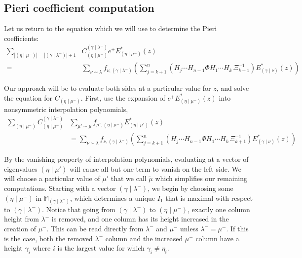 \documentclass[11pt]{article}
\theoremstyle{definition}
\numberwithin{equation}{section}
\newcommand{\ep}{e^+}
\newcommand{\Estar}[1]{E^*_{#1}}
\newcommand{\MM}{\mathbb{M}_{\gammalambdamin}}
\newcommand{\gammalambdamin}{{(\gamma \mid \lambda^-)}}
\newcommand{\gammanu}{{(\gamma \mid \nu)}}
\newcommand{\etamu}{{(\eta \mid \mu^-)}}
\newcommand{\etamuprime}{{(\eta \mid \mu')}}
\newcommand{\mutilde}{{\widetilde{\mu}}}
\newcommand{\fnu}{f_{\nu, \gammalambdamin}}
\newcommand{\gmuprime}{f_{\mu',\etamu}}
\begin{document}
    \subsection{Pieri coefficient computation}\label{Piericomputation}
Let us return to the equation which we will use to determine the Pieri coefficients:
\begin{align}\label{evaluatethis}\sum_{|\etamu| = |\gammalambdamin| + 1} &C^{\gammalambdamin}_{\etamu} \ep \Estar{\etamu}(z)\nonumber \\ = &\sum_{\nu \sim \lambda} \fnu \left( \sum_{j=k+1}^n \left( H_j \dotsm H_{n-1} \Phi H_1 \dotsm H_{k} \, \Xi_{k+1}^{-1} \right)  \Estar{\gammanu}(z)\right)\end{align}

Our approach will be to evaluate both sides at a particular value for $z$, and solve the equation for $C_{\etamu}$. First, use the expansion of $\ep \Estar{\etamu}(z)$ into nonsymmetric interpolation polynomials,
\begin{align}\label{evaluationpoint}\sum_{\etamu}  C^{\gammalambdamin}_{\etamu} &\sum_{\mu' \sim \mu} \gmuprime \Estar{\etamuprime}(z)\nonumber\\
&= \sum_{\nu \sim \lambda} \fnu \left( \sum_{j=k+1}^n \left( H_j \dotsm H_{n-1} \Phi H_1 \dotsm H_{k} \, \Xi_{k+1}^{-1} \right)  \Estar{\gammanu}(z)\right)\end{align}

By the vanishing property of interpolation polynomials, evaluating at a vector of eigenvalues $\overline{\etamuprime}$ will cause all but one term to vanish on the left side. We will choose a particular value of $\mu'$ that we call $\mutilde$ which simplifies our remaining computations. Starting with a vector $\gammalambdamin$, we begin by choosing some $\etamu$ in $\MM$, which determines a unique $I_1$ that is maximal with respect to $\gammalambdamin$. Notice that going from $\gammalambdamin$ to $\etamu$, exactly one column height from $\lambda^-$ is removed, and one column has its height increased in the creation of $\mu^-$. This can be read directly from $\lambda^-$ and $\mu^-$ unless $\lambda^-=\mu^-$. If this is the case, both the removed $\lambda^-$ column and the increased $\mu^-$ column have a height $\gamma_i$ where $i$ is the largest value for which $\gamma_i \neq \eta_i$.
\end{document}

